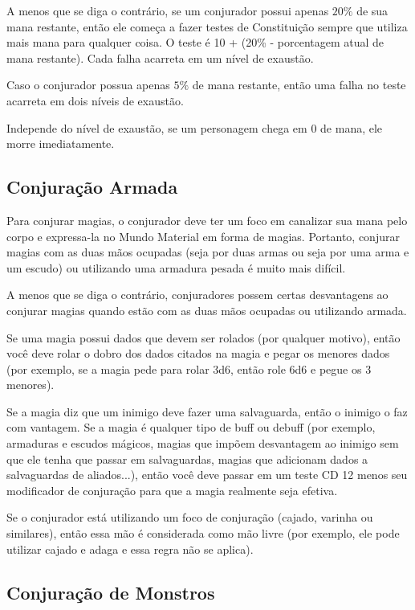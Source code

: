 \documentclass{RPG_Adventure}[2021/10/20]
\begin{document}
A menos que se diga o contrário, se um conjurador possui apenas $20\%$ de sua
mana restante, então ele começa a fazer testes de Constituição sempre que
utiliza mais mana para qualquer coisa. O teste é 10 + (20\% - porcentagem atual
de mana restante).  Cada falha acarreta em um nível de exaustão.

Caso o conjurador possua apenas $5\%$ de mana restante, então uma falha no teste
acarreta em dois níveis de exaustão.

Independe do nível de exaustão, se um personagem chega em $0$ de mana, ele
morre imediatamente.

\subsection*{Conjuração Armada}%
\label{sub:conjuracao_armada}

Para conjurar magias, o conjurador deve ter um foco em canalizar sua mana pelo
corpo e expressa-la no Mundo Material em forma de magias. Portanto, conjurar
magias com as duas mãos ocupadas (seja por duas armas ou seja por uma arma e um
escudo) ou utilizando uma armadura pesada é muito mais difícil.

A menos que se diga o contrário, conjuradores possem certas desvantagens ao
conjurar magias quando estão com as duas mãos ocupadas ou utilizando armada.

Se uma magia possui dados que devem ser rolados (por qualquer motivo), então você
deve rolar o dobro dos dados citados na magia e pegar os menores dados (por
exemplo, se a magia pede para rolar 3d6, então role 6d6 e pegue os 3 menores).

Se a magia diz que um inimigo deve fazer uma salvaguarda, então o inimigo o faz
com vantagem. Se a magia é qualquer tipo de buff ou debuff (por exemplo,
armaduras e escudos mágicos, magias que impõem desvantagem ao inimigo sem que ele
tenha que passar em salvaguardas, magias que adicionam dados a salvaguardas de
aliados...), então você deve passar em um teste CD 12 menos seu modificador de
conjuração para que a magia realmente seja efetiva.

Se o conjurador está utilizando um foco de conjuração (cajado, varinha ou
similares), então essa mão é considerada como mão livre (por exemplo, ele pode
utilizar cajado e adaga e essa regra não se aplica).

\subsection*{Conjuração de Monstros}%
\label{sub:conjuracao_de_monstros}
\end{document}

